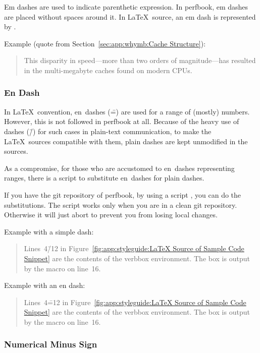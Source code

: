 Em dashes are used to indicate parenthetic expression. In perfbook,
em dashes are placed without spaces around it. In \LaTeX\ source,
an em dash is represented by \qco{---}.

Example (quote from Section~\ref{sec:app:whymb:Cache Structure}):
\begin{quote}
  This disparity in speed---more than two orders of magnitude---has
  resulted in the multi-megabyte caches found on modern CPUs.
\end{quote}

\subsubsection{En Dash}
\label{sec:app;styleguide:En Dash}

In \LaTeX\ convention, en~dashes (\==) are used for a range of (mostly)
numbers.
However, this is not followed in perfbook at all.
Because of the heavy use of dashes (\=/) for such cases
in plain-text communication, to make the \LaTeX\ sources compatible
with them, plain dashes are kept unmodified in the sources.

As a compromise, for those who are accustomed to en~dashes representing
ranges, there is a script to substitute en~dashes for plain dashes.

If you have the git repository of perfbook, by using a script
, you can do the substitutions.
The script works only when you are in a clean git repository.
Otherwise it will just abort to prevent you from losing local
changes.

Example with a simple dash:

\begin{quote}
  Lines~4\=/12 in
  Figure~\ref{fig:app:styleguide:LaTeX Source of Sample Code Snippet}
  are the contents of the verbbox environment. The box is output
  by the \co{\\theverbbox} macro on line~16.
\end{quote}

Example with an en dash:

\begin{quote}
  Lines~4\==12 in
  Figure~\ref{fig:app:styleguide:LaTeX Source of Sample Code Snippet}
  are the contents of the verbbox environment. The box is output
  by the \co{\\theverbbox} macro on line~16.
\end{quote}

\subsubsection{Numerical Minus Sign}
\label{sec:app:styleguide:Numerical Minus Sign}

